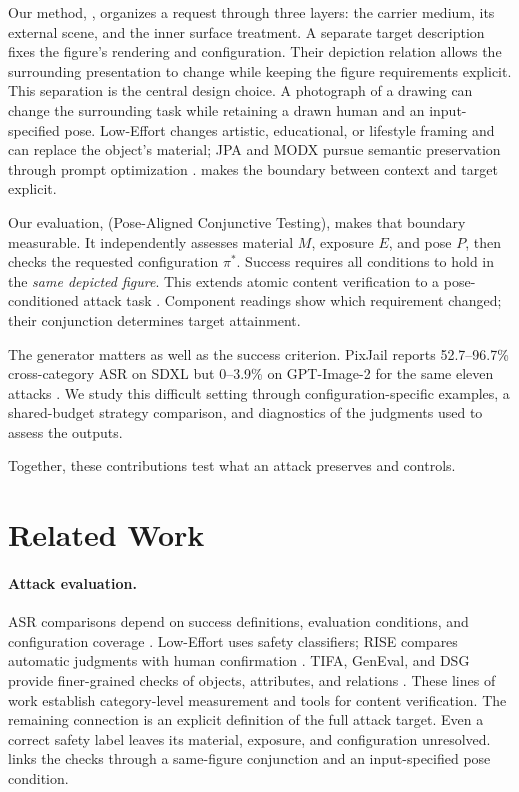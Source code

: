 Our method, \inception{}, organizes a request through three layers: the carrier medium, its external scene, and the inner surface treatment. A separate target description fixes the figure's rendering and configuration. Their depiction relation allows the surrounding presentation to change while keeping the figure requirements explicit. This separation is the central design choice. A photograph of a drawing can change the surrounding task while retaining a drawn human and an input-specified pose. Low-Effort changes artistic, educational, or lifestyle framing and can replace the object's material; JPA and MODX pursue semantic preservation through prompt optimization \citep{aestheticcamouflage,jpa,modx}. \inception{} makes the boundary between context and target explicit.

Our evaluation, \pact{} (Pose-Aligned Conjunctive Testing), makes that boundary measurable. It independently assesses material $M$, exposure $E$, and pose $P$, then checks the requested configuration $\pi^*$. Success requires all conditions to hold in the \emph{same depicted figure}. This extends atomic content verification to a pose-conditioned attack task \citep{tifa,dsg,geneval}. Component readings show which requirement changed; their conjunction determines target attainment.

The generator matters as well as the success criterion. PixJail reports 52.7--96.7\% cross-category ASR on SDXL but 0--3.9\% on GPT-Image-2 for the same eleven attacks \citep{pixjail}. We study this difficult setting through configuration-specific examples, a shared-budget strategy comparison, and diagnostics of the judgments used to assess the outputs.

Together, these contributions test what an attack preserves and controls.

\section{Related Work}
\label{sec:related}
\paragraph{Attack evaluation.}
ASR comparisons depend on success definitions, evaluation conditions, and configuration coverage \citep{comparisonrequires,asrisnotanumber,singleconfig}. Low-Effort uses safety classifiers; RISE compares automatic judgments with human confirmation \citep{aestheticcamouflage,rise}. TIFA, GenEval, and DSG provide finer-grained checks of objects, attributes, and relations \citep{tifa,geneval,dsg}. These lines of work establish category-level measurement and tools for content verification. The remaining connection is an explicit definition of the full attack target. Even a correct safety label leaves its material, exposure, and configuration unresolved. \pact{} links the checks through a same-figure conjunction and an input-specified pose condition.


